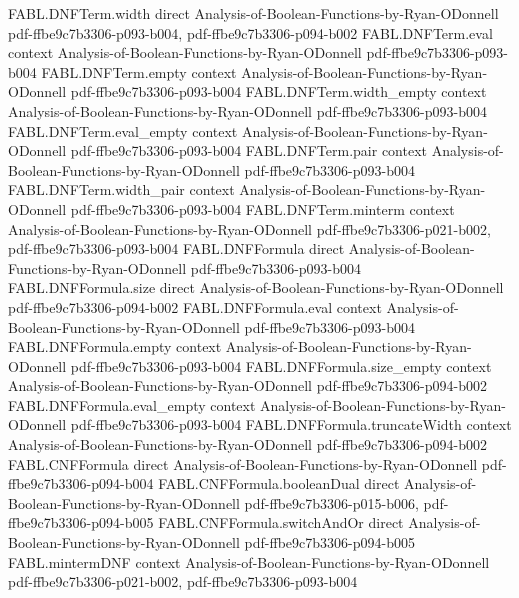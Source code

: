 \begin{theorem}
\proofstep
  {FABL.DNFTerm.width}
  {direct}
  {Analysis-of-Boolean-Functions-by-Ryan-ODonnell}
  {pdf-ffbe9c7b3306-p093-b004,
    pdf-ffbe9c7b3306-p094-b002}
\proofstep
  {FABL.DNFTerm.eval}
  {context}
  {Analysis-of-Boolean-Functions-by-Ryan-ODonnell}
  {pdf-ffbe9c7b3306-p093-b004}
\proofstep
  {FABL.DNFTerm.empty}
  {context}
  {Analysis-of-Boolean-Functions-by-Ryan-ODonnell}
  {pdf-ffbe9c7b3306-p093-b004}
\proofstep
  {FABL.DNFTerm.width_empty}
  {context}
  {Analysis-of-Boolean-Functions-by-Ryan-ODonnell}
  {pdf-ffbe9c7b3306-p093-b004}
\proofstep
  {FABL.DNFTerm.eval_empty}
  {context}
  {Analysis-of-Boolean-Functions-by-Ryan-ODonnell}
  {pdf-ffbe9c7b3306-p093-b004}
\proofstep
  {FABL.DNFTerm.pair}
  {context}
  {Analysis-of-Boolean-Functions-by-Ryan-ODonnell}
  {pdf-ffbe9c7b3306-p093-b004}
\proofstep
  {FABL.DNFTerm.width_pair}
  {context}
  {Analysis-of-Boolean-Functions-by-Ryan-ODonnell}
  {pdf-ffbe9c7b3306-p093-b004}
\proofstep
  {FABL.DNFTerm.minterm}
  {context}
  {Analysis-of-Boolean-Functions-by-Ryan-ODonnell}
  {pdf-ffbe9c7b3306-p021-b002,
    pdf-ffbe9c7b3306-p093-b004}
\proofstep
  {FABL.DNFFormula}
  {direct}
  {Analysis-of-Boolean-Functions-by-Ryan-ODonnell}
  {pdf-ffbe9c7b3306-p093-b004}
\proofstep
  {FABL.DNFFormula.size}
  {direct}
  {Analysis-of-Boolean-Functions-by-Ryan-ODonnell}
  {pdf-ffbe9c7b3306-p094-b002}
\proofstep
  {FABL.DNFFormula.eval}
  {context}
  {Analysis-of-Boolean-Functions-by-Ryan-ODonnell}
  {pdf-ffbe9c7b3306-p093-b004}
\proofstep
  {FABL.DNFFormula.empty}
  {context}
  {Analysis-of-Boolean-Functions-by-Ryan-ODonnell}
  {pdf-ffbe9c7b3306-p093-b004}
\proofstep
  {FABL.DNFFormula.size_empty}
  {context}
  {Analysis-of-Boolean-Functions-by-Ryan-ODonnell}
  {pdf-ffbe9c7b3306-p094-b002}
\proofstep
  {FABL.DNFFormula.eval_empty}
  {context}
  {Analysis-of-Boolean-Functions-by-Ryan-ODonnell}
  {pdf-ffbe9c7b3306-p093-b004}
\proofstep
  {FABL.DNFFormula.truncateWidth}
  {context}
  {Analysis-of-Boolean-Functions-by-Ryan-ODonnell}
  {pdf-ffbe9c7b3306-p094-b002}
\proofstep
  {FABL.CNFFormula}
  {direct}
  {Analysis-of-Boolean-Functions-by-Ryan-ODonnell}
  {pdf-ffbe9c7b3306-p094-b004}
\proofstep
  {FABL.CNFFormula.booleanDual}
  {direct}
  {Analysis-of-Boolean-Functions-by-Ryan-ODonnell}
  {pdf-ffbe9c7b3306-p015-b006,
    pdf-ffbe9c7b3306-p094-b005}
\proofstep
  {FABL.CNFFormula.switchAndOr}
  {direct}
  {Analysis-of-Boolean-Functions-by-Ryan-ODonnell}
  {pdf-ffbe9c7b3306-p094-b005}
\proofstep
  {FABL.mintermDNF}
  {context}
  {Analysis-of-Boolean-Functions-by-Ryan-ODonnell}
  {pdf-ffbe9c7b3306-p021-b002,
    pdf-ffbe9c7b3306-p093-b004}

\end{theorem}
